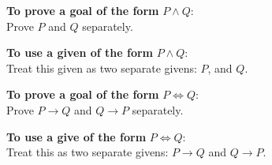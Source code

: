 \textbf{To prove a goal of the form} $P \land Q$:\\
Prove $P$ and $Q$ separately.

\textbf{To use a given of the form} $P \land Q$:\\
Treat this given as two separate givens: $P$, and $Q$.

\textbf{To prove a goal of the form} $P \iff Q$:\\
Prove $P \rightarrow Q$ and $Q \rightarrow P$ separately.

\textbf{To use a give of the form} $P \iff Q$:\\
Treat this as two separate givens: $P \rightarrow Q$ and $Q \rightarrow P$.